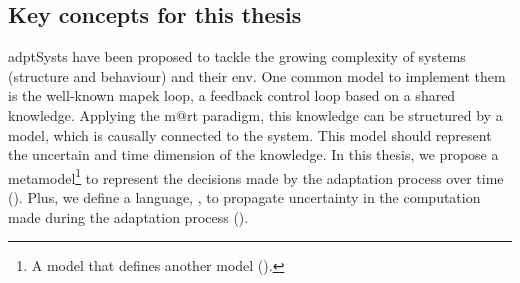 \subsection{Key concepts for this thesis}
\Glspl{adptSyst} have been proposed to tackle the growing complexity of systems (structure and behaviour) and their \gls{env}.
One common model to implement them is the well-known \gls{mapek} loop, a feedback control loop based on a shared knowledge.
Applying the \gls{m@rt} paradigm, this knowledge can be structured by a \gls{model}, which is causally connected to the system.
This \gls{model} should represent the uncertain and time dimension of the knowledge.
In this thesis, we propose a \gls{metamodel}\footnote{A model that defines another model (\cf {}).} to represent the decisions made by the adaptation process over time (\cf {}).
Plus, we define a language, \langName, to propagate uncertainty in the computation made during the adaptation process (\cf {}).







